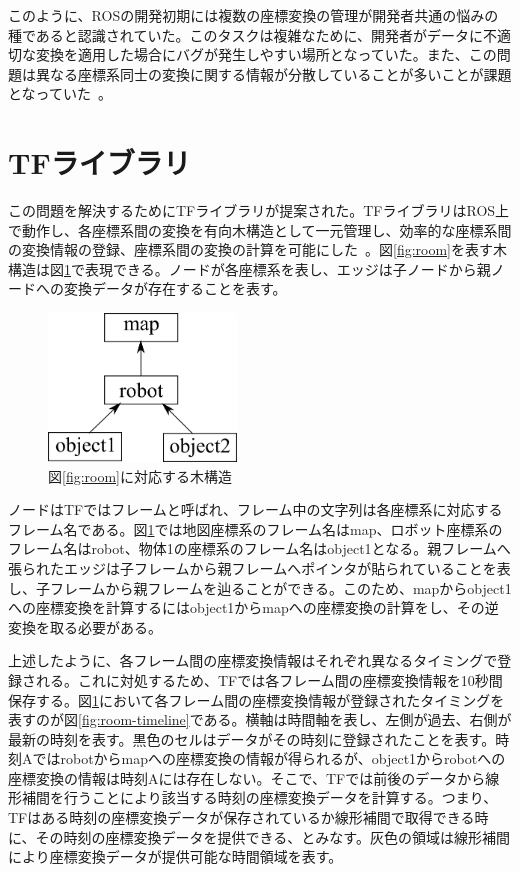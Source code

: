 \documentclass[a4paper]{jreport}	%
\begin{document}
このように、ROSの開発初期には複数の座標変換の管理が開発者共通の悩みの種であると認識されていた。このタスクは複雑なために、開発者がデータに不適切な変換を適用した場合にバグが発生しやすい場所となっていた。また、この問題は異なる座標系同士の変換に関する情報が分散していることが多いことが課題となっていた~\cite{tf}。

\section{TFライブラリ}
\label{section:intro-tf}

この問題を解決するためにTFライブラリが提案された。TFライブラリはROS上で動作し、各座標系間の変換を有向木構造として一元管理し、効率的な座標系間の変換情報の登録、座標系間の変換の計算を可能にした~\cite{tf}。図\ref{fig:room}を表す木構造は図\ref{fig:room-tree}で表現できる。ノードが各座標系を表し、エッジは子ノードから親ノードへの変換データが存在することを表す。

\begin{figure}[h] 
\centering
\includegraphics[width=5cm]{tree}	
\caption{図\ref{fig:room}に対応する木構造}
\label{fig:room-tree}
\end{figure}


ノードはTFではフレームと呼ばれ、フレーム中の文字列は各座標系に対応するフレーム名である。図\ref{fig:room-tree}では地図座標系のフレーム名はmap、ロボット座標系のフレーム名はrobot、物体1の座標系のフレーム名はobject1となる。親フレームへ張られたエッジは子フレームから親フレームへポインタが貼られていることを表し、子フレームから親フレームを辿ることができる。このため、mapからobject1への座標変換を計算するにはobject1からmapへの座標変換の計算をし、その逆変換を取る必要がある。

上述したように、各フレーム間の座標変換情報はそれぞれ異なるタイミングで登録される。これに対処するため、TFでは各フレーム間の座標変換情報を10秒間保存する。図\ref{fig:room-tree}において各フレーム間の座標変換情報が登録されたタイミングを表すのが図\ref{fig:room-timeline}である。横軸は時間軸を表し、左側が過去、右側が最新の時刻を表す。黒色のセルはデータがその時刻に登録されたことを表す。時刻Aではrobotからmapへの座標変換の情報が得られるが、object1からrobotへの座標変換の情報は時刻Aには存在しない。そこで、TFでは前後のデータから線形補間を行うことにより該当する時刻の座標変換データを計算する。つまり、TFはある時刻の座標変換データが保存されているか線形補間で取得できる時に、その時刻の座標変換データを提供できる、とみなす。灰色の領域は線形補間により座標変換データが提供可能な時間領域を表す。
\end{document}
